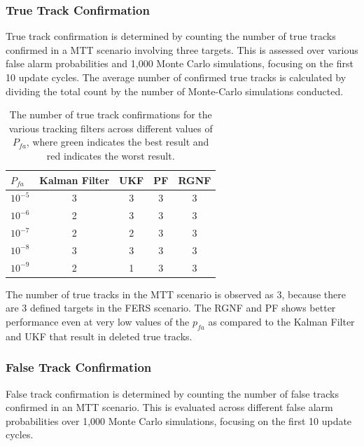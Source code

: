 \subsubsection{True Track Confirmation}
True track confirmation is determined by counting the number of true tracks confirmed in a \ac{MTT} scenario involving three targets. This is assessed over various false alarm probabilities and 1,000 Monte Carlo simulations, focusing on the first 10 update cycles. The average number of confirmed true tracks is calculated by dividing the total count by the number of Monte-Carlo simulations conducted.

\begin{table}[H]
    \centering
    \begin{tabular}{l c c c c}
        \toprule
        \textbf{\(P_{fa}\)} & \textbf{Kalman Filter} & \textbf{UKF} & \textbf{PF} & \textbf{RGNF} \\
        \midrule
        \(10^{-5}\) & \cellcolor{bestcell}3  & \cellcolor{bestcell}3  & \cellcolor{bestcell}3 & \cellcolor{bestcell}3 \\
        \(10^{-6}\) & 2                      & \cellcolor{bestcell}3  & \cellcolor{bestcell}3 & \cellcolor{bestcell}3 \\
        \(10^{-7}\) & 2                      & 2                      & \cellcolor{bestcell}3 & \cellcolor{bestcell}3 \\
        \(10^{-8}\) & \cellcolor{bestcell}3  & \cellcolor{bestcell}3  & \cellcolor{bestcell}3 & \cellcolor{bestcell}3 \\
        \(10^{-9}\) & 2                      & \cellcolor{worstcell}1 & \cellcolor{bestcell}3 & \cellcolor{bestcell}3 \\
        \bottomrule
    \end{tabular}
    \caption{The number of true track confirmations for the various tracking filters across
             different values of \(P_{fa}\), where green indicates
             the best result and red indicates the worst result.}
    \label{tab:Ptt}
\end{table}


The number of true tracks in the \ac{MTT} scenario is observed as 3, because there are 3 defined targets in the \ac{FERS} scenario. The \ac{RGNF} and \ac{PF} shows better performance even at very low values of the \(p_{fa}\) as compared to the Kalman Filter and \ac{UKF} that result in deleted true tracks.

\subsubsection{False Track Confirmation}
False track confirmation is determined by counting the number of false tracks confirmed in an \ac{MTT} scenario. This is evaluated across different false alarm probabilities over 1,000 Monte Carlo simulations, focusing on the first 10 update cycles.

